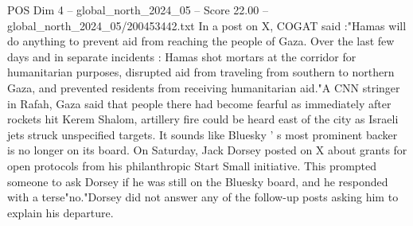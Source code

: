 \begin{textsample}{POS Dim 4 – global\_north\_2024\_05 – Score 22.00 – global\_north\_2024\_05/200453442.txt}
In a post on X, COGAT said :"Hamas will do anything to prevent aid from reaching the people of Gaza.
Over the last few days and in separate incidents : Hamas shot mortars at the corridor for humanitarian purposes, disrupted aid from traveling from southern to northern Gaza, and prevented residents from receiving humanitarian aid."A CNN stringer in Rafah, Gaza said that people there had become fearful as immediately after rockets hit Kerem Shalom, artillery fire could be heard east of the city as Israeli jets struck unspecified targets.
It sounds like Bluesky ' s most prominent backer is no longer on its board.
On Saturday, Jack Dorsey posted on X about grants for open protocols from his philanthropic Start Small initiative.
This prompted someone to ask Dorsey if he was still on the Bluesky board, and he responded with a terse"no."Dorsey did not answer any of the follow-up posts asking him to explain his departure.

\end{textsample}
